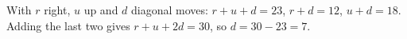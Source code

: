 With $r$ right, $u$ up and $d$ diagonal moves: $r+u+d=23$, $r+d=12$, $u+d=18$. Adding the last two gives $r+u+2d=30$, so $d=30-23=\boxed{7}$.
